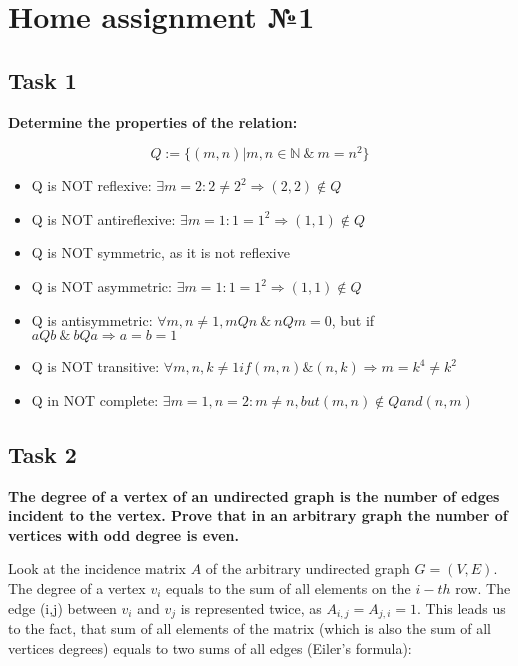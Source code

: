 \section{Home assignment №1}

\subsection{Task 1}
\begin{center}
\textbf{Determine the properties of the relation:}
\end{center}
\[ Q := \{(m,n) | m,n \in \mathbb{N}\ \& \ m = n^2\} \]

\begin{itemize}
\item Q is NOT reflexive: $\exists m = 2: 2 \neq 2^2 \Rightarrow (2,2) \notin Q$
\item Q is NOT antireflexive: $\exists m = 1: 1 = 1^2 \Rightarrow (1,1) \notin Q$
\item Q is NOT symmetric, as it is not reflexive
\item Q is NOT asymmetric: $\exists m = 1: 1 = 1^2 \Rightarrow (1,1) \notin Q$
\item Q is antisymmetric: $\forall m, n \neq 1, mQn\ \& \ nQm = 0$, but if $aQb\ \& \ bQa \Rightarrow a = b = 1$
\item Q is NOT transitive: $\forall m,n,k \neq 1 if (m,n) \& (n,k) \Rightarrow m = k^4 \neq k^2$
\item Q in NOT complete: $\exists m=1, n=2: m \neq n, but (m,n) \notin Q and (n,m)$
\end{itemize}

\subsection{Task 2}
\begin{center}
\textbf{
The degree of a vertex of an undirected graph is the number of edges incident to the vertex.
 Prove that in an arbitrary graph the number of vertices with odd degree is even.}
\end{center}
Look at the incidence matrix $A$ of the arbitrary undirected graph $G=(V,E)$.
The degree of a vertex $v_i$ equals to the sum of all elements on the $i-th$ row. 
The edge (i,j) between $v_i$ and $v_j$ is represented twice, as $A_{i,j}=A_{j,i} = 1$.
This leads us to the fact, that sum of all elements of the matrix (which is also the sum of all vertices degrees) equals to two sums of all edges (Eiler's formula):

